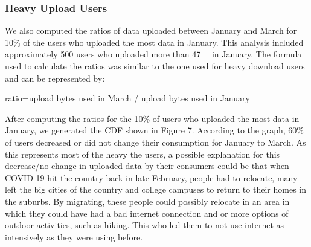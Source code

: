 \documentclass[conference,10pt]{IEEEtran}
\begin{document}
\subsubsection{Heavy Upload Users}
\label{sec:heavy-upload-users}

We also computed the ratios of data uploaded between January and March for 10\% of the users who uploaded the most data in January. This analysis included approximately 500 users who uploaded more than \SI{47}{\giga\byte} in January. The formula used to calculate the ratios was similar to the one used for heavy download users and can be represented by:

ratio=upload bytes used in March / upload bytes used in January

After computing the ratios for the 10\% of users who uploaded the most data in January, we generated the CDF shown in Figure 7. According to the graph, 60\% of users decreased or did not change their consumption for January to March. As this represents most of the heavy the users, a possible explanation for this decrease/no change in uploaded data by their consumers could be that when COVID-19 hit the country back in late February, people had to relocate, many left the big cities of the country and college campuses to return to their homes in the suburbs. By migrating, these people could possibly relocate in an area in which they could have had a bad internet connection and or more options of outdoor activities, such as hiking. This who led them to not use internet as intensively as they were using before.
\end{document}
